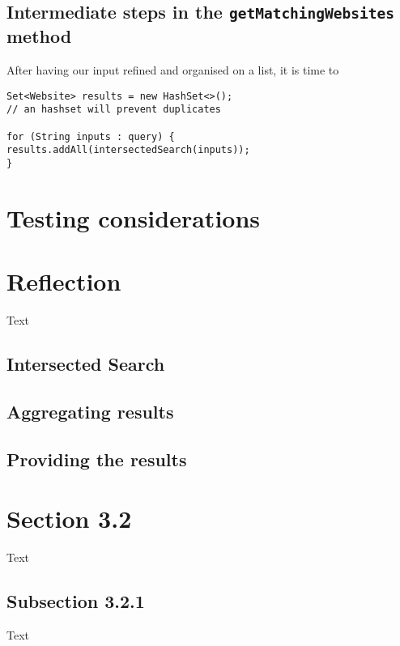 \subsection{Intermediate steps in the {\tt getMatchingWebsites} method}
After having our input refined and organised on a list, it is time to
\begin{lstlisting}
Set<Website> results = new HashSet<>();
// an hashset will prevent duplicates

for (String inputs : query) {
results.addAll(intersectedSearch(inputs));
}
\end{lstlisting}
\section{Testing considerations} %

\section{Reflection} %

Text \\
\subsection{Intersected Search}


\subsection{Aggregating results}

\subsection{Providing the results}

\section{Section 3.2}
Text\\




\subsection{Subsection 3.2.1}
Text\\
